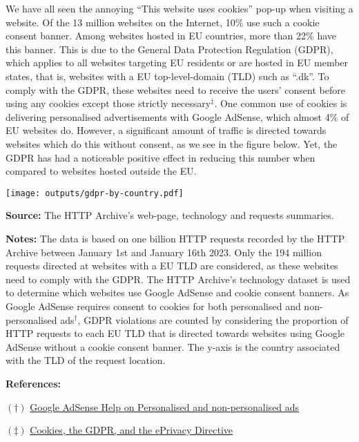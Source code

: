 \documentclass[border=0mm]{article}
\begin{document}
\begin{minipage}{0.5\textwidth}
\small
\vspace*{0.2cm}
We have all seen the annoying ``This website uses cookies'' pop-up when visiting a website.
Of the 13 million websites on the Internet, 10\% use such a cookie consent banner. Among
websites hosted in EU countries, more than 22\% have this banner.
This is due to the General Data Protection Regulation (GDPR), which
applies to all websites targeting EU residents
or are hosted in EU member states, that is, websites with a EU top-level-domain (TLD)
such as ``.dk''. To comply with the GDPR, these websites need to receive the users' consent
before using any cookies except those strictly necessary$^\ddagger$. One common use of cookies is delivering
personalised advertisements with Google AdSense, which almost 4\% of EU websites do.
However, a significant amount of traffic is directed towards websites which do this without
consent, as we see in the figure below. Yet, the GDPR has had a noticeable positive effect in reducing this number when compared
to websites hosted outside the EU.

\vspace*{.2cm}

\texttt{[image: outputs/gdpr-by-country.pdf]}

{\small\linespread{.1}\selectfont\fontsize{8pt}{.1cm}\selectfont
\textbf{Source:} The HTTP Archive's web-page, technology and requests summaries.

\textbf{Notes:} The data is based on one billion HTTP requests recorded by the HTTP Archive
    between January 1st and January 16th 2023. Only the 194 million requests
    directed at websites with a EU TLD are considered, as these websites need
    to comply with the GDPR.
    The HTTP Archive's technology dataset is used
    to determine which websites use Google AdSense and cookie consent banners. As Google AdSense
    requires consent to cookies for both personalised and non-personalised ads$^{\dagger}$,
    GDPR violations are counted by considering the proportion of HTTP requests to each EU TLD that
    is directed towards websites using Google AdSense without a cookie consent banner.
    The y-axis is the country associated with the TLD of the request location.
\par}


\begin{references}[width=1\textwidth,arc=10pt,auto outer arc]
\textbf{References:}

$(\dagger)$ \href{https://support.google.com/adsense/answer/9007336}{\color{dark} Google AdSense Help on Personalised and non-personalised ads}

$(\ddagger)$ \href{https://gdpr.eu/cookies/}{\color{dark} Cookies, the GDPR, and the ePrivacy Directive}
\end{references}



\end{minipage}%
\end{document}
